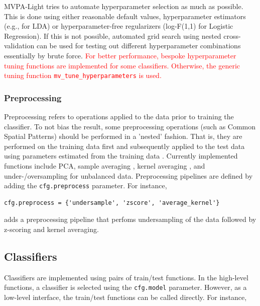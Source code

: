 \documentclass[utf8]{frontiersSCNS} %
\newcommand{\ttt}[1]{\texttt{#1}}
\newcommand{\red}[1]{\textcolor{red}{#1}}
\begin{document}
MVPA-Light tries to automate hyperparameter selection as much as possible. This is done using either reasonable default values, hyperparameter estimators (e.g., \cite{Ledoit2003HoneyMatrix} for LDA) or  hyperparameter-free regularizers (log-F(1,1) for Logistic Regression). If this is not possible, automated grid search using nested cross-validation can be used for testing out different hyperparameter combinations essentially by brute force. \red{For better performance, bespoke hyperparameter tuning functions are implemented for some classifiers. Otherwise, the generic tuning function \ttt{mv\_tune\_hyperparameters} is used.}

\subsubsection{Preprocessing}\label{sec:preprocessing}

Preprocessing refers to operations applied to the data prior to training the classifier. To not bias the result, some preprocessing operations (such as Common Spatial Patterns) should be performed in a 'nested' fashion. That is, they are performed on the training data first and subsequently applied to the test data using parameters estimated from the training data \citep{Lemm2011,Varoquaux2017}. 
Currently implemented functions include PCA, sample averaging \citep{Cichy2017MultivariateSpace}, kernel averaging \citep{Treder2018}, and under-/oversampling for unbalanced data. Preprocessing pipelines are defined by adding the \ttt{cfg.preprocess} parameter. For instance,

\begin{verbatim}
cfg.preprocess = {'undersample', 'zscore', 'average_kernel'}
\end{verbatim}

adds a preprocessing pipeline that perfoms undersampling of the data followed by z-scoring and kernel averaging.

\subsection{Classifiers}\label{sec:classifiers}

Classifiers are implemented using pairs of train/test functions. In the high-level functions, a classifier is selected using the \ttt{cfg.model} parameter. However, as a low-level interface, the train/test functions can be called directly. For instance, 
\end{document}
